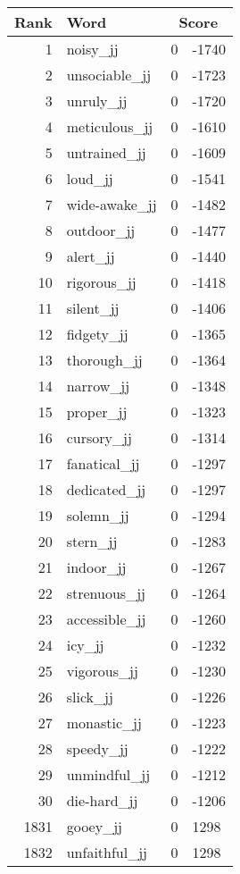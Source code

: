 \begin{longtable}[!htbp]{| rlr@{.}l |}
    \hline
    \textbf{Rank} & \textbf{Word} & \multicolumn{2}{c|}{\textbf{Score}} \\
    \hline
    \endhead
    1 & noisy\_jj & 0 & -1740 \\
    2 & unsociable\_jj & 0 & -1723 \\
    3 & unruly\_jj & 0 & -1720 \\
    4 & meticulous\_jj & 0 & -1610 \\
    5 & untrained\_jj & 0 & -1609 \\
    6 & loud\_jj & 0 & -1541 \\
    7 & wide-awake\_jj & 0 & -1482 \\
    8 & outdoor\_jj & 0 & -1477 \\
    9 & alert\_jj & 0 & -1440 \\
    10 & rigorous\_jj & 0 & -1418 \\
    11 & silent\_jj & 0 & -1406 \\
    12 & fidgety\_jj & 0 & -1365 \\
    13 & thorough\_jj & 0 & -1364 \\
    14 & narrow\_jj & 0 & -1348 \\
    15 & proper\_jj & 0 & -1323 \\
    16 & cursory\_jj & 0 & -1314 \\
    17 & fanatical\_jj & 0 & -1297 \\
    18 & dedicated\_jj & 0 & -1297 \\
    19 & solemn\_jj & 0 & -1294 \\
    20 & stern\_jj & 0 & -1283 \\
    21 & indoor\_jj & 0 & -1267 \\
    22 & strenuous\_jj & 0 & -1264 \\
    23 & accessible\_jj & 0 & -1260 \\
    24 & icy\_jj & 0 & -1232 \\
    25 & vigorous\_jj & 0 & -1230 \\
    26 & slick\_jj & 0 & -1226 \\
    27 & monastic\_jj & 0 & -1223 \\
    28 & speedy\_jj & 0 & -1222 \\
    29 & unmindful\_jj & 0 & -1212 \\
    30 & die-hard\_jj & 0 & -1206 \\
    1831 & gooey\_jj & 0 & 1298 \\
    1832 & unfaithful\_jj & 0 & 1298 \\

\end{longtable}
